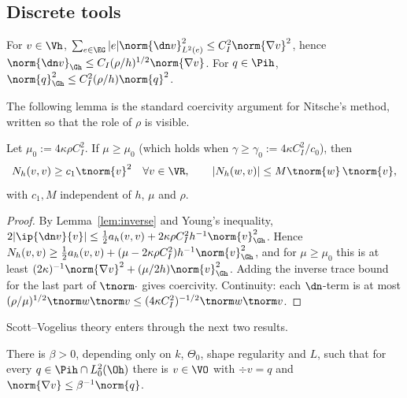\subsection{Discrete tools}
\begin{lemma}\label{lem:inverse}
For $v\in\Vh$, $\sum_{e\in\EG}|e|\norm{\dn v}^2_{L^2(e)}\le C_I^2\norm{\nabla v}^2$, hence $\norm{\dn v}_{\Gh}\le C_I(\rho/h)^{1/2}\norm{\nabla v}$. For $q\in\Pih$, $\norm{q}^2_{\Gh}\le C_I^2(\rho/h)\norm{q}^2$.
\end{lemma}

The following lemma is the standard coercivity argument for Nitsche's method, written so that the role of $\rho$ is visible.

\begin{lemma}\label{lem:coercive}
Let $\mu_0:=4\kappa\rho C_I^2$. If $\mu\ge\mu_0$ (which holds when $\gamma\ge\gamma_0:=4\kappa C_I^2/c_0$), then
\[
N_h(v,v)\ge c_1\tnorm{v}^2\quad\forall v\in\VR,\qquad |N_h(w,v)|\le M\tnorm{w}\,\tnorm{v},
\]
with $c_1,M$ independent of $h$, $\mu$ and $\rho$.
\end{lemma}

\begin{proof}
By Lemma~\ref{lem:inverse} and Young's inequality, $2|\ip{\dn v}{v}|\le\frac12a_h(v,v)+2\kappa\rho C_I^2h^{-1}\norm{v}^2_{\Gh}$. Hence $N_h(v,v)\ge\frac12a_h(v,v)+(\mu-2\kappa\rho C_I^2)h^{-1}\norm{v}^2_{\Gh}$, and for $\mu\ge\mu_0$ this is at least $(2\kappa)^{-1}\norm{\nabla v}^2+(\mu/2h)\norm{v}^2_{\Gh}$. Adding the inverse trace bound for the last part of $\tnorm\cdot$ gives coercivity. Continuity: each $\dn$-term is at most $(\rho/\mu)^{1/2}\tnorm w\tnorm v\le(4\kappa C_I^2)^{-1/2}\tnorm w\tnorm v$.
\end{proof}

Scott--Vogelius theory enters through the next two results.

\begin{lemma}\label{lem:infsup}
There is $\beta>0$, depending only on $k$, $\Theta_0$, shape regularity and $L$, such that for every $q\in\Pih\cap L^2_0(\Oh)$ there is $v\in\VO$ with $\div v=q$ and $\norm{\nabla v}\le\beta^{-1}\norm{q}$.
\end{lemma}

